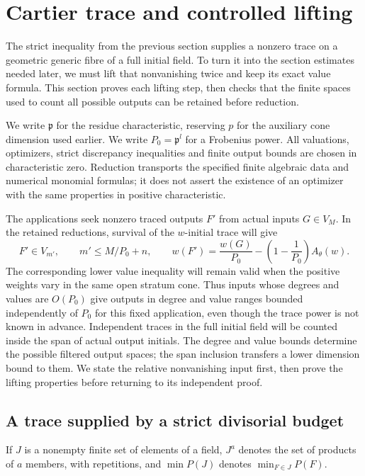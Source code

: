 \section{Cartier trace and controlled lifting}
\label{c:trace-section}

The strict inequality from the previous section supplies a nonzero trace
on a geometric generic fibre of a full initial field. To turn it into
the section estimates needed later, we must lift that nonvanishing twice
and keep its exact value formula. This section proves each lifting step,
then checks that the finite spaces used to count all possible outputs
can be retained before reduction.

We write $\mathfrak p$ for the residue characteristic, reserving $p$
for the auxiliary cone dimension used earlier.  We write $P_0=\mathfrak p^l$ for a Frobenius
power.  All valuations, optimizers, strict discrepancy inequalities and
finite output bounds are chosen in characteristic zero.  Reduction transports
the specified finite algebraic data and numerical monomial formulas; it does
not assert the existence of an optimizer with the same properties in positive
characteristic.

The applications seek nonzero traced outputs $F'$ from actual inputs
$G\in V_M$.  In the retained reductions, survival of the $w$-initial
trace will give
\[
 F'\in V_{m'},\qquad m'\le M/P_0+n,\qquad
 w(F')=\frac{w(G)}{P_0}
       -\left(1-\frac1{P_0}\right)A_\theta(w).
\]
The corresponding lower value inequality will remain valid when the
positive weights vary in the same open stratum cone.  Thus inputs whose
degrees and values are $O(P_0)$ give outputs in degree and value ranges
bounded independently of $P_0$ for this fixed application, even though
the trace power is not known in advance.  Independent
traces in the full initial field will be counted inside the span of
actual output initials.  The degree and value bounds determine the
possible filtered output spaces; the span inclusion transfers a lower
dimension bound to them.  We state the
relative nonvanishing input first, then prove the lifting properties
before returning to its independent proof.

\subsection{A trace supplied by a strict divisorial budget}

If $J$ is a nonempty finite set of elements of a field, $J^a$ denotes the
set of products of $a$ members, with repetitions, and $\min P(J)$ denotes
$\min_{F\in J}P(F)$.

